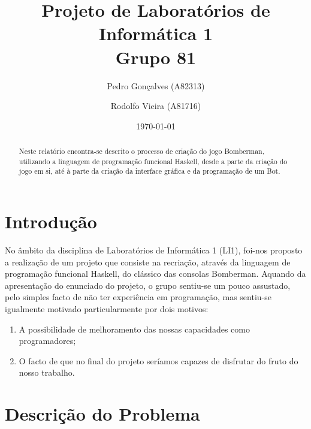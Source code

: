 \documentclass[a4paper]{article}
\title{Projeto de Laboratórios de Informática 1\\Grupo 81}
\author{Pedro Gonçalves (A82313) \and Rodolfo Vieira (A81716)}
\date{\today}
\begin{document}
\maketitle
\newpage
\begin{abstract}
Neste relatório encontra-se descrito o processo de criação do jogo Bomberman, utilizando a linguagem de programação funcional Haskell, desde a parte da criação do jogo em si, até à parte da criação da interface gráfica e da programação de um Bot.
\end{abstract}

\tableofcontents
\newpage
\section{Introdução}
\label{sec:intro}
No âmbito da disciplina de Laboratórios de Informática 1 (LI1), foi-nos proposto a realização de um projeto que consiste na recriação, através da linguagem de programação funcional Haskell, do clássico das consolas Bomberman.
Aquando da apresentação do enunciado do projeto, o grupo sentiu-se um pouco assustado, pelo simples facto de não ter experiência em programação, mas sentiu-se igualmente motivado particularmente por dois motivos:
\begin{enumerate}
\item A possibilidade de melhoramento das nossas capacidades como programadores;
\item O facto de que no final do projeto seríamos capazes de disfrutar do fruto do nosso trabalho.
\end{enumerate}
\newpage
\section{Descrição do Problema}
\label{sec:problema}
\end{document}
